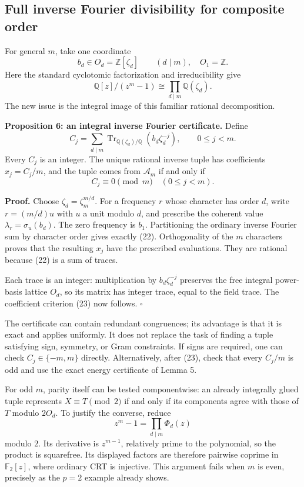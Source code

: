 \documentclass[
  11pt,
]{article}
\begin{document}
\subsection{Full inverse Fourier divisibility for composite
order}\label{full-inverse-fourier-divisibility-for-composite-order}

For general \(m\), take one coordinate \[
 b_d\in O_d=\mathbb Z[\zeta_d]\qquad(d\mid m),
 \quad O_1=\mathbb Z.
 \] Here the standard cyclotomic factorization and irreducibility give
\[
 \mathbb Q[z]/(z^m-1)\cong
       \prod_{d\mid m}\mathbb Q(\zeta_d).
 \] The new issue is the integral image of this familiar rational
decomposition.

\textbf{Proposition 6: an integral inverse Fourier certificate.} Define
\[
 C_j=\sum_{d\mid m}
       \operatorname{Tr}_{\mathbb Q(\zeta_d)/\mathbb Q}
                 (b_d\zeta_d^{-j}),\qquad 0\le j<m.        \tag{22}
\] Every \(C_j\) is an integer. The unique rational inverse tuple has
coefficients \(x_j=C_j/m\), and the tuple comes from \(\mathcal A_m\) if
and only if \[
                         C_j\equiv0\pmod m
                         \quad(0\le j<m).                 \tag{23}
\]

\textbf{Proof.} Choose \(\zeta_d=\zeta_m^{m/d}\). For a frequency \(r\)
whose character has order \(d\), write \(r=(m/d)u\) with \(u\) a unit
modulo \(d\), and prescribe the coherent value
\(\lambda_r=\sigma_u(b_d)\). The zero frequency is \(b_1\). Partitioning
the ordinary inverse Fourier sum by character order gives exactly (22).
Orthogonality of the \(m\) characters proves that the resulting \(x_j\)
have the prescribed evaluations. They are rational because (22) is a sum
of traces.

Each trace is an integer: multiplication by \(b_d\zeta_d^{-j}\)
preserves the free integral power-basis lattice \(O_d\), so its matrix
has integer trace, equal to the field trace. The coefficient criterion
(23) now follows. \(\square\)

The certificate can contain redundant congruences; its advantage is that
it is exact and applies uniformly. It does not replace the task of
finding a tuple satisfying sign, symmetry, or Gram constraints. If signs
are required, one can check \(C_j\in\{-m,m\}\) directly. Alternatively,
after (23), check that every \(C_j/m\) is odd and use the exact energy
certificate of Lemma 5.

For odd \(m\), parity itself can be tested componentwise: an already
integrally glued tuple represents \(X\equiv T\pmod2\) if and only if its
components agree with those of \(T\) modulo \(2O_d\). To justify the
converse, reduce \[
 z^m-1=\prod_{d\mid m}\Phi_d(z)
 \] modulo \(2\). Its derivative is \(z^{m-1}\), relatively prime to the
polynomial, so the product is squarefree. Its displayed factors are
therefore pairwise coprime in \(\mathbb F_2[z]\), where ordinary CRT is
injective. This argument fails when \(m\) is even, precisely as the
\(p=2\) example already shows.
\end{document}
